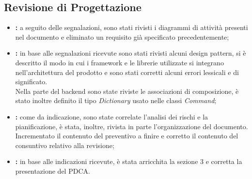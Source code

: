 	\subsection{Revisione di Progettazione}
	\begin{itemize}
		\item \textbf{\docNameAdR:} a seguito delle segnalazioni, sono stati rivisti i diagrammi di attività presenti nel documento e eliminato un requisito già specificato precedentemente;
		\item \textbf{\docNameST:} in base alle segnalazioni ricevute sono stati rivisti alcuni design pattern, si è descritto il modo in cui i framework e le librerie utilizzate si integrano nell'architettura del prodotto e sono stati corretti alcuni errori lessicali e di significato.\\
		Nella parte del backend sono state riviste le associazioni di composizione, è stato inoltre definito il tipo \textit{Dictionary} usato nelle classi \textit{Command};
		\item \textbf{\docNamePdP:} come da indicazione, sono state correlate l'analisi dei rischi e la pianificazione, è stata, inoltre, rivista in parte l'organizzazione del documento. Incrementato il contenuto del preventivo a finire e corretto il contenuto del consuntivo relativo alla revisione;
		\item \textbf{\docNamePdQ:} in base alle indicazioni ricevute, è stata arricchita la sezione 3 e corretta la presentazione del PDCA. 
	\end{itemize}

\pagebreak